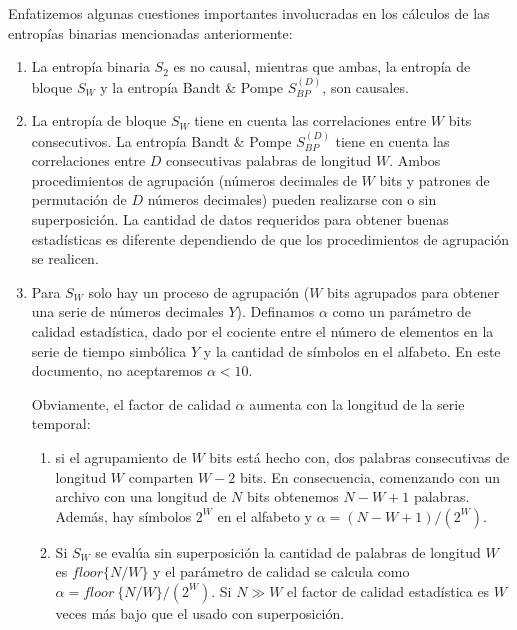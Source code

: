 Enfatizemos algunas cuestiones importantes involucradas en los cálculos de las entropías binarias mencionadas anteriormente:
\begin{enumerate}
	\item La entropía binaria $S_2$ es no causal, mientras que ambas, la entropía de bloque $S_W$ y la entropía Bandt \& Pompe $S^{(D)}_{BP}$, son causales.
	\item La entropía de bloque $S_W$ tiene en cuenta las correlaciones entre $W$ bits consecutivos.
	La entropía Bandt \& Pompe $S^{(D)}_{BP}$ tiene en cuenta las correlaciones entre $D$ consecutivas palabras de longitud $W$.
	Ambos procedimientos de agrupación (números decimales de $W$ bits y patrones de permutación de $D$ números decimales) pueden realizarse con o sin superposición.
	La cantidad de datos requeridos para obtener buenas estadísticas es diferente dependiendo de que los procedimientos de agrupación se realicen.
	\item Para $ S_W $ solo hay un proceso de agrupación ($W$ bits agrupados para obtener una serie de números decimales $Y$).
	Definamos $\alpha$ como un parámetro de calidad estadística, dado por el cociente entre el número de elementos en la serie de tiempo simbólica $Y$ y la cantidad de símbolos en el alfabeto.
	En este documento, no aceptaremos $\alpha < 10$.
	
	Obviamente, el factor de calidad $\alpha$ aumenta con la longitud de la serie temporal:
	\begin{enumerate}
		\item si el agrupamiento de $W$ bits está hecho con, dos palabras consecutivas de longitud $W$ comparten $W-2$ bits.
		En consecuencia, comenzando con un archivo con una longitud de $N$ bits obtenemos $N - W + 1$ palabras.
		Además, hay símbolos $2 ^ W$ en el alfabeto y $\alpha = (N - W + 1) / (2 ^ W)$.
		\item Si $S_W$ se evalúa sin superposición la cantidad de palabras de longitud $W$ es $floor\{N/W\}$ y el parámetro de calidad se calcula como $\alpha=floor~\{N/W\}/(2^W)$.
		Si $N \gg W$ el factor de calidad estadística es $W$ veces más bajo que el usado con superposición.
	\end{enumerate}
	

\end{enumerate}
